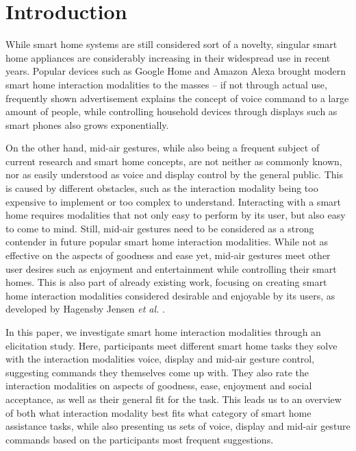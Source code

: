 \documentclass[sigchi]{acmart}
\begin{document}
	
	
	
	
	\maketitle
	
	\section{Introduction}
	While smart home systems are still considered sort of a novelty, singular smart home appliances are considerably increasing in their widespread use in recent years. Popular devices such as Google Home and Amazon Alexa brought modern smart home interaction modalities to the masses – if not through actual use, frequently shown advertisement explains the concept of voice command to a large amount of people, while controlling household devices through displays such as smart phones also grows exponentially. 
	
	On the other hand, mid-air gestures, while also being a frequent subject of current research and smart home concepts, are not neither as commonly known, nor as easily understood as voice and display control by the general public. This is caused by different obstacles, such as the interaction modality being too expensive to implement or too complex to understand. Interacting with a smart home requires modalities that not only easy to perform by its user, but also easy to come to mind. Still, mid-air gestures need to be considered as a strong contender in future popular smart home interaction modalities. While not as effective on the aspects of goodness and ease yet, mid-air gestures meet other user desires such as enjoyment and entertainment while controlling their smart homes. This is also part of already existing work, focusing on creating smart home interaction modalities considered desirable and enjoyable by its users, as developed by Hagensby Jensen \textit{et al.} \cite{Jensen.2018}. 
	 
	In this paper, we investigate smart home interaction modalities through an elicitation study. Here, participants meet different smart home tasks they solve with the interaction modalities voice, display and mid-air gesture control, suggesting commands they themselves come up with. They also rate the interaction modalities on aspects of goodness, ease, enjoyment and social acceptance, as well as their general fit for the task. This leads us to an overview of both what interaction modality best fits what category of smart home assistance tasks, while also presenting us sets of voice, display and mid-air gesture commands based on the participants most frequent suggestions. 
\end{document}
